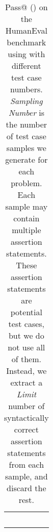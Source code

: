 \begin{table}[t]
\begin{subtable}[t]{0.325\linewidth}
{\begin{tabular}{cllll}
             &  &  &  &  \\
             &  &  &  &  \\
             &  &  &  &  \\
             &  &  &  &  \\
             &  &  &  &  \\
            \bottomrule
            \end{tabular}
        }
        \caption{}
	\end{subtable}
	 \begin{subtable}[t]{0.325\linewidth}
	    \centering
        \caption{}
	\end{subtable}
    \caption{Pass@ () on the HumanEval benchmark using \ours with different test case numbers. \textit{Sampling Number} is the number of test case samples we generate for each problem. Each sample may contain multiple assertion statements. These assertion statements are potential test cases, but we do not use all of them. Instead, we extract a \textit{Limit} number of syntactically correct assertion statements from each sample, and discard the rest.}
    \label{tab:differ_test_case_number}
\end{table}

